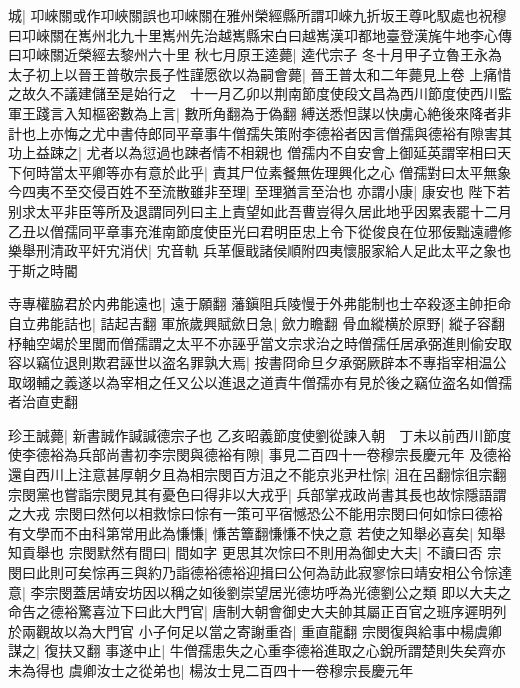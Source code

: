 城|{
	卭崍關或作卭峽關誤也卭崍關在雅州榮經縣所謂卭崍九折坂王尊叱馭處也祝穆曰卭崍關在嶲州北九十里嶲州先治越嶲縣宋白曰越嶲漢卭都地臺登漢旄牛地李心傳曰卭崍關近榮經去黎州六十里}
秋七月原王逵薨|{
	逵代宗子}
冬十月甲子立魯王永為太子初上以晉王普敬宗長子性謹愿欲以為嗣會薨|{
	晉王普太和二年薨見上卷}
上痛惜之故久不議建儲至是始行之　十一月乙卯以荆南節度使段文昌為西川節度使西川監軍王踐言入知樞密數為上言|{
	數所角翻為于偽翻}
縛送悉怛謀以快虜心絶後來降者非計也上亦悔之尤中書侍郎同平章事牛僧孺失策附李德裕者因言僧孺與德裕有隙害其功上益踈之|{
	尤者以為愆過也踈者情不相親也}
僧孺内不自安會上御延英謂宰相曰天下何時當太平卿等亦有意於此乎|{
	責其尸位素餐無佐理興化之心}
僧孺對曰太平無象今四夷不至交侵百姓不至流散雖非至理|{
	至理猶言至治也}
亦謂小康|{
	康安也}
陛下若别求太平非臣等所及退謂同列曰主上責望如此吾曹豈得久居此地乎因累表罷十二月乙丑以僧孺同平章事充淮南節度使臣光曰君明臣忠上令下從俊良在位邪佞黜遠禮修樂舉刑清政平奸宄消伏|{
	宄音軌}
兵革偃戢諸侯順附四夷懷服家給人足此太平之象也于斯之時閽

寺專權脇君於内弗能遠也|{
	遠于願翻}
藩鎭阻兵陵慢于外弗能制也士卒殺逐主帥拒命自立弗能詰也|{
	詰起吉翻}
軍旅歲興賦歛日急|{
	歛力瞻翻}
骨血縱横於原野|{
	縱子容翻}
杼軸空竭於里閭而僧孺謂之太平不亦誣乎當文宗求治之時僧孺任居承弼進則偷安取容以竊位退則欺君誣世以盗名罪孰大焉|{
	按書冏命旦夕承弼厥辟本不專指宰相温公取翊輔之義遂以為宰相之任又公以進退之道責牛僧孺亦有見於後之竊位盗名如僧孺者治直吏翻}


珍王誠薨|{
	新書誠作諴諴德宗子也}
乙亥昭義節度使劉從諫入朝　丁未以前西川節度使李德裕為兵部尚書初李宗閔與德裕有隙|{
	事見二百四十一卷穆宗長慶元年}
及德裕還自西川上注意甚厚朝夕且為相宗閔百方沮之不能京兆尹杜悰|{
	沮在呂翻悰徂宗翻}
宗閔黨也嘗詣宗閔見其有憂色曰得非以大戎乎|{
	兵部掌戎政尚書其長也故悰隱語謂之大戎}
宗閔曰然何以相救悰曰悰有一策可平宿憾恐公不能用宗閔曰何如悰曰德裕有文學而不由科第常用此為慊慊|{
	慊苦簟翻慊慊不快之意}
若使之知舉必喜矣|{
	知舉知貢舉也}
宗閔默然有間曰|{
	間如字}
更思其次悰曰不則用為御史大夫|{
	不讀曰否}
宗閔曰此則可矣悰再三與約乃詣德裕德裕迎揖曰公何為訪此寂寥悰曰靖安相公令悰達意|{
	李宗閔蓋居靖安坊因以稱之如後劉崇望居光德坊呼為光德劉公之類}
即以大夫之命告之德裕驚喜泣下曰此大門官|{
	唐制大朝會御史大夫帥其屬正百官之班序遲明列於兩觀故以為大門官}
小子何足以當之寄謝重沓|{
	重直龍翻}
宗閔復與給事中楊虞卿謀之|{
	復扶又翻}
事遂中止|{
	牛僧孺患失之心重李德裕進取之心銳所謂楚則失矣齊亦未為得也}
虞卿汝士之從弟也|{
	楊汝士見二百四十一卷穆宗長慶元年}


